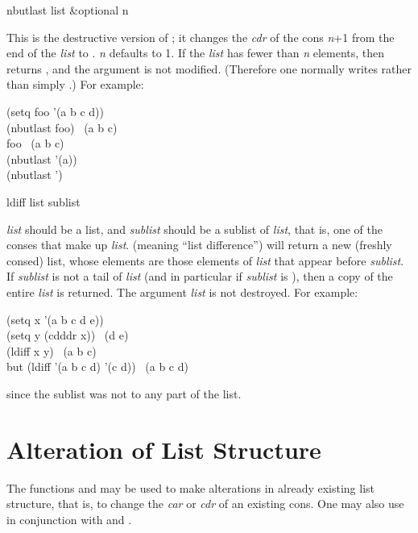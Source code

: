 \begin{defun}[Function]
nbutlast list &optional n

This is the destructive version of ; it changes the {\it cdr} of
the cons {\it n}+1 from the end of the {\it list} to {\nil}.  {\it n} defaults to 1.
If the {\it list} has fewer than {\it n} elements, then 
returns {\empty}, and the argument is not modified.  (Therefore
one normally writes  rather than simply
.)
For example:
\begin{lisp}
(setq foo '(a b c d)) \\
(nbutlast foo) \EV\ (a b c) \\
foo \EV\ (a b c) \\
(nbutlast '(a)) \EV\ {\empty} \\
(nbutlast '{\nil}) \EV\ {\empty}
\end{lisp}
\end{defun}


\begin{defun}[Function]
ldiff list sublist

{\it list} should be a list, and {\it sublist} should be a sublist
of {\it list}, that is, one of the conses that make up {\it list}.
 (meaning ``list difference'') will return a new (freshly consed)
list, whose elements are those elements of {\it list} that appear before
{\it sublist}.  If {\it sublist} is not a tail of {\it list}
(and in particular if {\it sublist} is {\nil}),
then a copy of the entire {\it list} is returned.
The argument {\it list} is not destroyed.
For example:
\begin{lisp}
(setq x '(a b c d e)) \\
(setq y (cdddr x)) \EV\ (d e) \\
(ldiff x y) \EV\ (a b c) \\[4pt]
{\rm but} (ldiff '(a b c d) '(c d)) \EV\ (a b c d)
\end{lisp}
since the sublist was not  to any part of the list.
\end{defun}


\section{Alteration of List Structure}

The functions  and 
may be used to make alterations in already existing
list structure, that is, to change the {\it car} or {\it cdr} of an
existing cons.
One may also use  in conjunction with  and .

